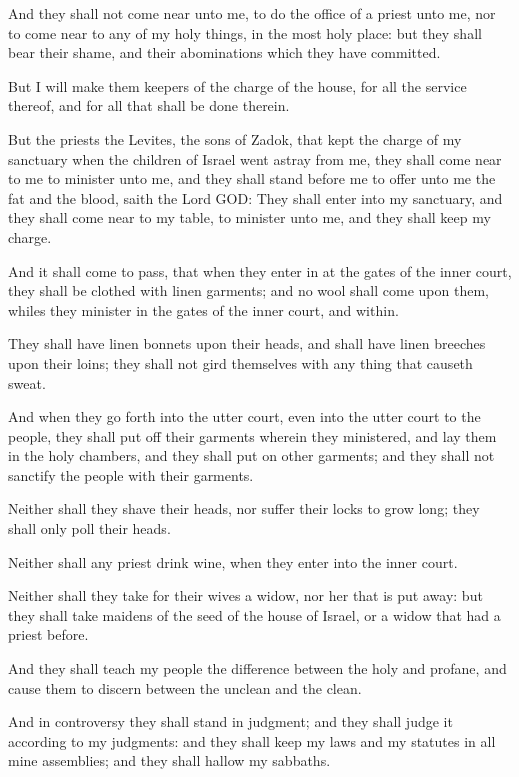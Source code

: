 \verse And they shall not come near unto me, to do the office of a priest unto me, nor to come near to any of my holy things, in the most holy place: but they shall bear their shame, and their abominations which they have committed.

\verse But I will make them keepers of the charge of the house, for all the service thereof, and for all that shall be done therein.

\verse But the priests the Levites, the sons of Zadok, that kept the charge of my sanctuary when the children of Israel went astray from me, they shall come near to me to minister unto me, and they shall stand before me to offer unto me the fat and the blood, saith the Lord GOD: \verse They shall enter into my sanctuary, and they shall come near to my table, to minister unto me, and they shall keep my charge.

\verse And it shall come to pass, that when they enter in at the gates of the inner court, they shall be clothed with linen garments; and no wool shall come upon them, whiles they minister in the gates of the inner court, and within.

\verse They shall have linen bonnets upon their heads, and shall have linen breeches upon their loins; they shall not gird themselves with any thing that causeth sweat.

\verse And when they go forth into the utter court, even into the utter court to the people, they shall put off their garments wherein they ministered, and lay them in the holy chambers, and they shall put on other garments; and they shall not sanctify the people with their garments.

\verse Neither shall they shave their heads, nor suffer their locks to grow long; they shall only poll their heads.

\verse Neither shall any priest drink wine, when they enter into the inner court.

\verse Neither shall they take for their wives a widow, nor her that is put away: but they shall take maidens of the seed of the house of Israel, or a widow that had a priest before.

\verse And they shall teach my people the difference between the holy and profane, and cause them to discern between the unclean and the clean.

\verse And in controversy they shall stand in judgment; and they shall judge it according to my judgments: and they shall keep my laws and my statutes in all mine assemblies; and they shall hallow my sabbaths.

